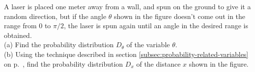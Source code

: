 A laser is placed one meter away from a wall, and spun
on the ground to give it a random direction, but if the angle $\theta$ shown in the figure
 doesn't
come out in the range from 0 to $\pi/2$, the laser is spun again until
an angle in the desired range is obtained.\\
(a) Find the probability distribution $D_\theta$ of the variable $\theta$.\\
(b) Using the technique described in section \ref{subsec:probability-related-variables}
on p.~\pageref{subsec:probability-related-variables}, find the probability distribution
$D_x$ of the distance $x$ shown in the figure.\answercheck

